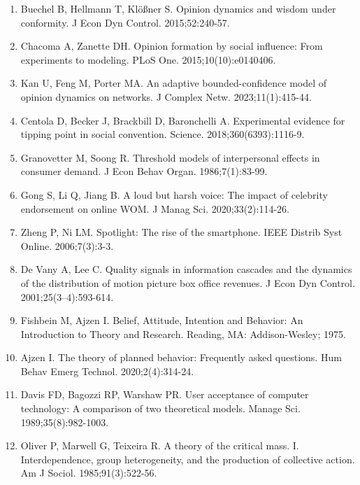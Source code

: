 \documentclass[10pt,letterpaper]{article}
\begin{document}
\begin{enumerate}
\item Buechel B, Hellmann T, Kl{\"o}{\ss}ner S.
Opinion dynamics and wisdom under conformity.
J Econ Dyn Control. 2015;52:240-57.

\item Chacoma A, Zanette DH.
Opinion formation by social influence: From experiments to modeling.
PLoS One. 2015;10(10):e0140406.

\item Kan U, Feng M, Porter MA.
An adaptive bounded-confidence model of opinion dynamics on networks.
J Complex Netw. 2023;11(1):415-44.

\item Centola D, Becker J, Brackbill D, Baronchelli A.
Experimental evidence for tipping point in social convention.
Science. 2018;360(6393):1116-9.

\item Granovetter M, Soong R.
Threshold models of interpersonal effects in consumer demand.
J Econ Behav Organ. 1986;7(1):83-99.

\item Gong S, Li Q, Jiang B.
A loud but harsh voice: The impact of celebrity endorsement on online
  {WOM}.
J Manag Sci. 2020;33(2):114-26.

\item Zheng P, Ni LM.
Spotlight: The rise of the smartphone.
IEEE Distrib Syst Online. 2006;7(3):3-3.

\item De Vany A, Lee C.
Quality signals in information cascades and the dynamics of the
  distribution of motion picture box office revenues.
J Econ Dyn Control. 2001;25(3--4):593-614.

\item Fishbein M, Ajzen I.
Belief, Attitude, Intention and Behavior: An Introduction to Theory
  and Research.
Reading, MA: Addison-Wesley; 1975.

\item Ajzen I.
The theory of planned behavior: Frequently asked questions.
Hum Behav Emerg Technol. 2020;2(4):314-24.

\item Davis FD, Bagozzi RP, Warshaw PR.
User acceptance of computer technology: A comparison of two
  theoretical models.
Manage Sci. 1989;35(8):982-1003.

\item Oliver P, Marwell G, Teixeira R.
A theory of the critical mass. {I}. {I}nterdependence, group
  heterogeneity, and the production of collective action.
Am J Sociol. 1985;91(3):522-56.


\end{enumerate}
\end{document}
